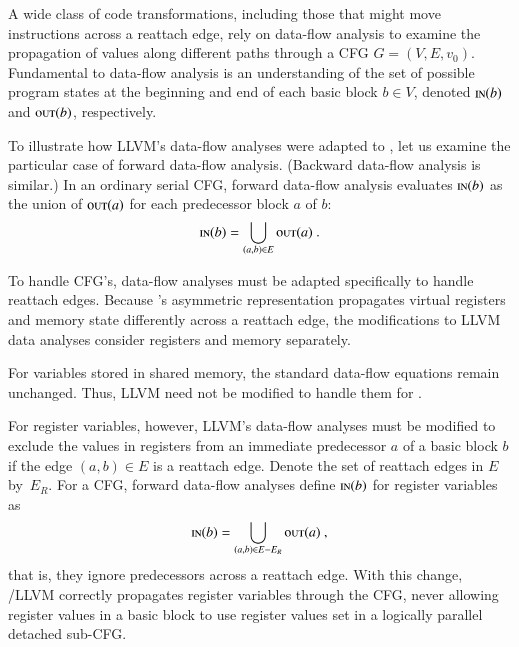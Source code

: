 A wide class of code transformations, including those that might move
instructions across a reattach edge, rely on data-flow analysis
\cite[Ch.~9]{AhoLaSe06} to examine the propagation of values along
different paths through a CFG $G=(V,E,v_0)$.  Fundamental to data-flow
analysis is an understanding of the set of possible program states at
the beginning and end of each basic block $b\in V$, denoted
$\textnormal{\scshape in}(b)$ and $\textnormal{\scshape out}(b)$, respectively.

To illustrate how LLVM's data-flow analyses were adapted to \tapir,
let us examine the particular case of forward data-flow analysis.
(Backward data-flow analysis is similar.)  In an ordinary serial CFG,
forward data-flow analysis evaluates $\textnormal{\scshape in}(b)$ as the union of
$\textnormal{\scshape out}(a)$ for each predecessor block $a$ of $b$:
\[
\textnormal{\scshape in}(b) = \bigcup_{(a,b)\in E}\textnormal{\scshape out}(a)\ .
\]

To handle \tapir CFG's, data-flow analyses must be adapted
specifically to handle reattach edges.  Because \tapir's asymmetric
representation propagates virtual registers and memory state
differently across a reattach edge, the modifications to LLVM data
analyses consider registers and memory separately.

For variables stored in shared memory, the
standard data-flow equations remain unchanged. Thus, LLVM need not be
modified to handle them for \tapir.

For register variables, however, LLVM's data-flow analyses must be
modified to exclude the values in registers from an immediate
predecessor $a$ of a basic block $b$ if the edge $(a,b)\in E$ is a
reattach edge.  Denote the set of reattach edges in $E$ by~$E_{R}$.
For a \tapir CFG, forward data-flow analyses define $\textnormal{\scshape in}(b)$ for
register variables as
\[
\textnormal{\scshape in}(b) = \bigcup_{(a,b)\in E - E_{R}}\textnormal{\scshape out}(a)\ ,
\]
that is, they ignore predecessors across a reattach edge.  With this
change, \tapir/LLVM correctly propagates register variables through
the CFG, never allowing register values in a basic block to use
register values set in a logically parallel detached sub-CFG.


